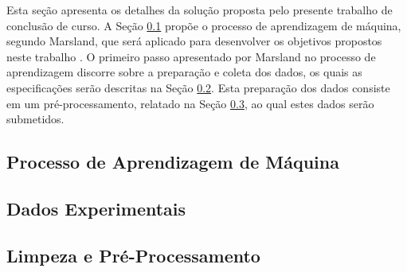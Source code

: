 Esta seção apresenta os detalhes da solução proposta pelo presente trabalho de conclusão de curso. A Seção \ref{subsec:tarefa} propõe o processo de aprendizagem de máquina, segundo Marsland, que será aplicado para desenvolver os objetivos propostos neste trabalho \cite{ref:marsland}. O primeiro passo apresentado por Marsland no processo de aprendizagem discorre sobre a preparação e coleta dos dados, os quais as especificações serão descritas na Seção \ref{subsec:dados}. Esta preparação dos dados consiste em um pré-processamento, relatado na Seção \ref{subsec:pre-process}, ao qual estes dados serão submetidos.

\subsection{Processo de Aprendizagem de Máquina} \label{subsec:tarefa}


\subsection{Dados Experimentais} \label{subsec:dados}


\subsection{Limpeza e Pré-Processamento} \label{subsec:pre-process}


%
